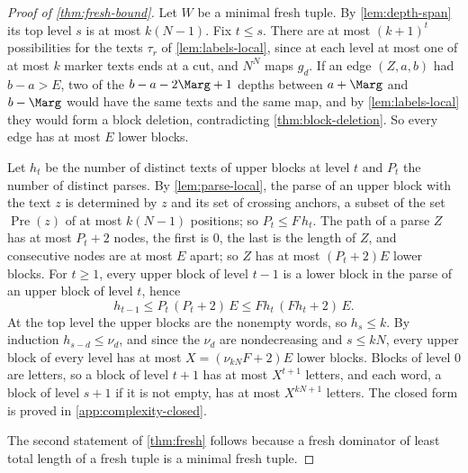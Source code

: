 \begin{proof}[Proof of \cref{thm:fresh-bound}]
Let $W$ be a minimal fresh tuple. By \cref{lem:depth-span} its top level
$s$ is at most $k(N-1)$. Fix $t\le s$. There are at most $(k+1)^t$
possibilities for the texts $\tau_r$ of \cref{lem:labels-local}, since at
each level at most one of at most $k$ marker texts ends at a cut, and
$N^N$ maps $g_d$. If an edge $(Z,a,b)$ had $b-a>E$, two of the
$b-a-2\Marg+1$ depths between $a+\Marg$ and $b-\Marg$ would have the same
texts and the same map, and by \cref{lem:labels-local} they would form a
block deletion, contradicting \cref{thm:block-deletion}. So every edge has
at most $E$ lower blocks.

Let $h_t$ be the number of distinct texts of upper blocks at level $t$ and
$P_t$ the number of distinct parses. By \cref{lem:parse-local}, the parse of
an upper block with the text $z$ is determined by $z$ and its set of
crossing anchors, a subset of the set $\operatorname{Pre}(z)$ of at most
$k(N-1)$ positions; so $P_t\le F\,h_t$. The path of a parse $Z$ has at most
$P_t+2$ nodes, the first is $0$, the last is the length of $Z$, and
consecutive nodes are at most $E$ apart; so $Z$ has at most $(P_t+2)E$ lower
blocks. For $t\ge1$, every upper block of level $t-1$ is a lower block in
the parse of an upper block of level $t$, hence
\[
  h_{t-1}\le P_t\,(P_t+2)\,E\le F h_t\,(F h_t+2)\,E .
\]
At the top level the upper blocks are the nonempty words, so $h_s\le k$. By
induction $h_{s-d}\le\nu_d$, and since the $\nu_d$ are nondecreasing and
$s\le kN$, every upper block of every level has at most $X=(\nu_{kN}F+2)E$
lower blocks. Blocks of level $0$ are letters, so a block of level $t+1$ has
at most $X^{t+1}$ letters, and each word, a block of level $s+1$ if it is not
empty, has at most $X^{kN+1}$ letters. The closed form is proved in
\cref{app:complexity-closed}.

The second statement of \cref{thm:fresh} follows because a fresh dominator
of least total length of a fresh tuple is a minimal fresh tuple.
\end{proof}
